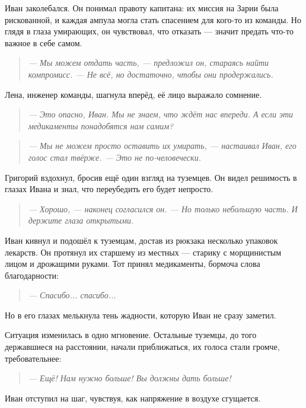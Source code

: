 \documentclass[12pt,a4paper]{book}
\newenvironment{dialogue}{\begin{quote}\itshape}{\end{quote}} %
\begin{document}
Иван заколебался. Он понимал правоту капитана: их миссия на Зарии была рискованной, и каждая ампула могла стать спасением для кого-то из команды. Но глядя в глаза умирающих, он чувствовал, что отказать --- значит предать что-то важное в себе самом.

\begin{dialogue}
--- Мы можем отдать часть, --- предложил он, стараясь найти компромисс. --- Не всё, но достаточно, чтобы они продержались.
\end{dialogue}

Лена, инженер команды, шагнула вперёд, её лицо выражало сомнение.

\begin{dialogue}
--- Это опасно, Иван. Мы не знаем, что ждёт нас впереди. А если эти медикаменты понадобятся нам самим?
\end{dialogue}

\begin{dialogue}
--- Мы не можем просто оставить их умирать, --- настаивал Иван, его голос стал твёрже. --- Это не по-человечески.
\end{dialogue}

Григорий вздохнул, бросив ещё один взгляд на туземцев. Он видел решимость в глазах Ивана и знал, что переубедить его будет непросто.

\begin{dialogue}
--- Хорошо, --- наконец согласился он. --- Но только небольшую часть. И держите глаза открытыми.
\end{dialogue}

Иван кивнул и подошёл к туземцам, достав из рюкзака несколько упаковок лекарств. Он протянул их старшему из местных --- старику с морщинистым лицом и дрожащими руками. Тот принял медикаменты, бормоча слова благодарности:

\begin{dialogue}
--- Спасибо... спасибо...
\end{dialogue}

Но в его глазах мелькнула тень жадности, которую Иван не сразу заметил.

Ситуация изменилась в одно мгновение. Остальные туземцы, до того державшиеся на расстоянии, начали приближаться, их голоса стали громче, требовательнее:

\begin{dialogue}
--- Ещё! Нам нужно больше! Вы должны дать больше!
\end{dialogue}

Иван отступил на шаг, чувствуя, как напряжение в воздухе сгущается.
\end{document}
